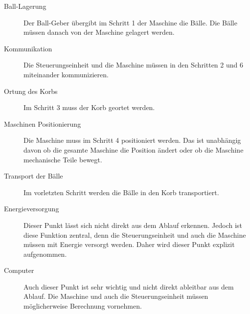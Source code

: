 \begin{description}
    \item [Ball-Lagerung] Der Ball-Geber übergibt im Schritt 1 der 
        Maschine die Bälle. Die Bälle müssen danach von der Maschine 
        gelagert werden.
    \item [Kommunikation] Die Steuerungseinheit und die Maschine müssen 
        in den Schritten 2 und 6 miteinander kommunizieren.
    \item [Ortung des Korbs] Im Schritt 3 muss der Korb geortet werden.
    \item [Maschinen Positionierung] Die Maschine muss im Schritt 4 
        positioniert werden. Das ist unabhängig davon ob die gesamte 
        Maschine die Position ändert oder ob die Maschine mechanische 
        Teile bewegt.
    \item [Transport der Bälle] Im vorletzten Schritt werden die Bälle 
        in den Korb transportiert.
    \item [Energieversorgung] Dieser Punkt lässt sich nicht direkt aus 
        dem Ablauf erkennen. Jedoch ist diese Funktion zentral, denn 
        die Steuerungseinheit und auch die Maschine müssen mit Energie 
        versorgt werden. Daher wird dieser Punkt explizit aufgenommen.
    \item [Computer] Auch dieser Punkt ist sehr wichtig und nicht direkt 
        ableitbar aus dem Ablauf. Die Maschine und auch die 
        Steuerungseinheit müssen möglicherweise Berechnung vornehmen.
\end{description}
